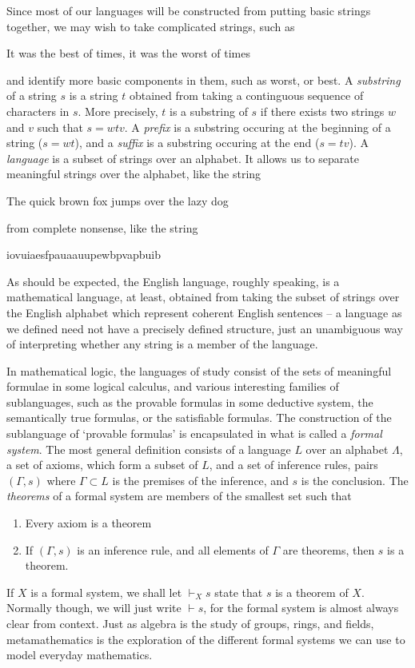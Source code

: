 Since most of our languages will be constructed from putting basic strings together, we may wish to take complicated strings, such as
%
\begin{center}
    \textsf{It was the best of times, it was the worst of times}
\end{center}
%
and identify more basic components in them, such as \textsf{worst}, or \textsf{best}. A \emph{substring} of a string $s$ is a string $t$ obtained from taking a continguous sequence of characters in $s$. More precisely, $t$ is a substring of $s$ if there exists two strings $w$ and $v$ such that $s = wtv$. A \emph{prefix} is a substring occuring at the beginning of a string ($s = wt$), and a \emph{suffix} is a substring occuring at the end ($s = tv$). A \emph{language} is a subset of strings over an alphabet. It allows us to separate meaningful strings over the alphabet, like the string
%
\begin{center}
    \textsf{The quick brown fox jumps over the lazy dog}
\end{center}
%
from complete nonsense, like the string
%
\begin{center}
    \textsf{iovuiaesfpauaauupewbpvapbuib}
\end{center}
%
As should be expected, the English language, roughly speaking, is a mathematical language, at least, obtained from taking the subset of strings over the English alphabet which represent coherent English sentences -- a language as we defined need not have a precisely defined structure, just an unambiguous way of interpreting whether any string is a member of the language.

In mathematical logic, the languages of study consist of the sets of meaningful formulae in some logical calculus, and various interesting families of sublanguages, such as the provable formulas in some deductive system, the semantically true formulas, or the satisfiable formulas. The construction of the sublanguage of `provable formulas' is encapsulated in what is called a \emph{formal system}. The most general definition consists of a language $L$ over an alphabet $\Lambda$, a set of axioms, which form a subset of $L$, and a set of inference rules, pairs $(\Gamma, s)$ where $\Gamma \subset L$ is the premises of the inference, and $s$ is the conclusion. The \emph{theorems} of a formal system are members of the smallest set such that
%
\begin{enumerate}
    \item Every axiom is a theorem
    \item If $(\Gamma, s)$ is an inference rule, and all elements of $\Gamma$ are theorems, then $s$ is a theorem.
\end{enumerate}
%
If $X$ is a formal system, we shall let $\vdash_X s$ state that $s$ is a theorem of $X$. Normally though, we will just write $\vdash s$, for the formal system is almost always clear from context. Just as algebra is the study of groups, rings, and fields, metamathematics is the exploration of the different formal systems we can use to model everyday mathematics.

